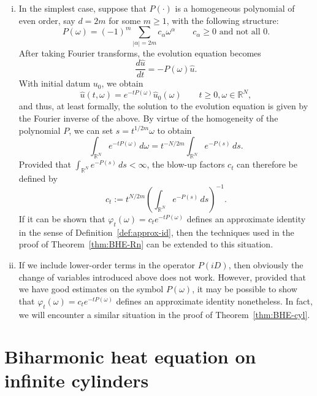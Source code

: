 \documentclass[a4paper, reqno]{amsart}
\numberwithin{equation}{section}
\theoremstyle{plain}
\theoremstyle{definition}
\theoremstyle{remark}
\newcommand{\RR}{\mathbb{R}}
\begin{document}
\begin{enumerate}[(i)]
\item In the simplest case, suppose that $P(\cdot)$ is a homogeneous polynomial of even order, say $d = 2m$ for some $m \geq 1$, with the following structure:
  \begin{equation*}
    P(\omega) = (-1)^m \sum_{|\alpha| = 2m} c_\alpha \omega^\alpha \qquad c_\alpha \geq 0 \text{ and not all }0.
  \end{equation*}
  After taking Fourier transforms, the evolution equation becomes
  \begin{equation*}
    \frac{d \widehat{u}}{dt} = -P(\omega) \widehat{u}.
  \end{equation*}
  With initial datum $u_0$, we obtain
  \begin{equation*}
    \widehat{u}(t, \omega) = e^{-t P(\omega)} \widehat{u}_0(\omega) \qquad t \geq 0, \omega \in \RR^N,
  \end{equation*}
  and thus, at least formally, the solution to the evolution equation is given by the Fourier inverse of the above. By virtue of the homogeneity of the polynomial $P$, we can set $s = t^{1/2m} \omega$ to obtain
  \begin{equation*}
    \int_{\RR^N} e^{-tP(\omega)} \,d\omega = t^{-N/2m} \int_{\RR^N} e^{-P(s)} \,ds.
  \end{equation*}
  Provided that $\int_{\RR^N} e^{-P(s)} \,ds < \infty$, the blow-up factors $c_t$ can therefore be defined by
  \begin{equation*}
    c_t := t^{N/2m} \left(\int_{\RR^N} e^{-P(s)} \,ds \right)^{-1}.
  \end{equation*}
  If it can be shown that $\varphi_t(\omega) = c_t e^{-t P(\omega)}$ defines an approximate identity in the sense of Definition~\ref{def:approx-id}, then the techniques used in the proof of Theorem~\ref{thm:BHE-Rn} can be extended to this situation.

\item If we include lower-order terms in the operator $P(iD)$, then obviously the change of variables introduced above does not work. However, provided that we have good estimates on the symbol $P(\omega)$, it may be possible to show that $\varphi_t(\omega) = c_t e^{-tP(\omega)}$ defines an approximate identity nonetheless. In fact, we will encounter a similar situation in the proof of Theorem~\ref{thm:BHE-cyl}.
\end{enumerate}

\section{Biharmonic heat equation on infinite cylinders}
\label{sec:cyl}
\end{document}

